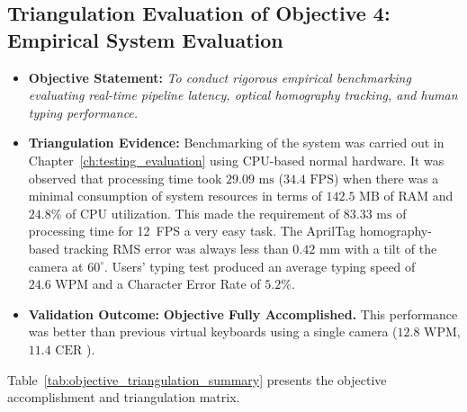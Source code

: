 \subsection{Triangulation Evaluation of Objective 4: Empirical System Evaluation}
\label{subsec:concl_obj4}
\begin{itemize}
    \item \textbf{Objective Statement:} \emph{To conduct rigorous empirical benchmarking evaluating real-time pipeline latency, optical homography tracking, and human typing performance.}
    \item \textbf{Triangulation Evidence:} Benchmarking of the system was carried out in Chapter~\ref{ch:testing_evaluation} using CPU-based normal hardware. It was observed that processing time took $29.09\text{ ms}$ ($34.4\text{ FPS}$) when there was a minimal consumption of system resources in terms of $142.5\text{ MB}$ of RAM and $24.8\%$ of CPU utilization. This made the requirement of $83.33\text{ ms}$ of processing time for 12~FPS a very easy task. The AprilTag homography-based tracking RMS error was always less than $0.42\text{ mm}$ with a tilt of the camera at $60^\circ$. Users' typing test produced an average typing speed of $24.6\text{ WPM}$ and a Character Error Rate of $5.2\%$.
    \item \textbf{Validation Outcome:} \textbf{Objective Fully Accomplished.} This performance was better than previous virtual keyboards using a single camera ($12.8\text{ WPM}$, $11.4\text{ CER}$ \cite{Ji2018Local}).
\end{itemize}

Table~\ref{tab:objective_triangulation_summary} presents the objective accomplishment and triangulation matrix.

